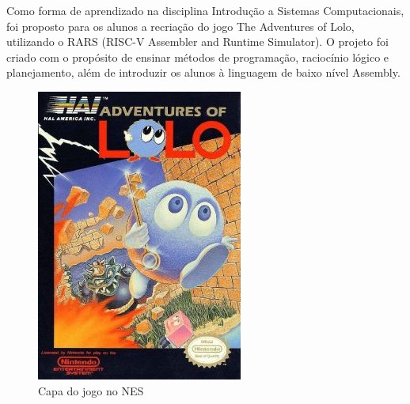 \documentclass[10pt, conference, compsocconf]{IEEEtran}
\begin{document}
Como forma de aprendizado na disciplina Introdução a Sistemas Computacionais,
foi proposto para os alunos a recriação do jogo The Adventures of Lolo,
utilizando o RARS (RISC-V Assembler and Runtime Simulator). O projeto foi criado
com o propósito de ensinar métodos de programação, raciocínio lógico e
planejamento, além de introduzir os alunos à linguagem de baixo nível Assembly.

\begin{figure}[htb]
  \begin{center}
   \includegraphics[width=0.3\linewidth]{./Figures/image_1.png}
  \end{center}
  \caption{Capa do jogo no NES}
  \label{fig:01}
\end{figure}
\end{document}
